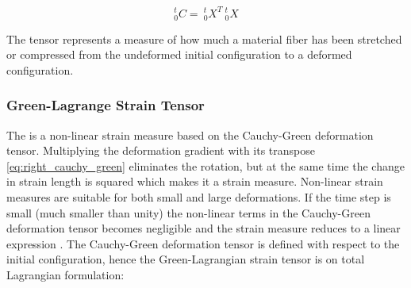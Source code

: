 \begin{equation}
\label{eq:right_cauchy_green}
^t_0C = \ ^t_0X^T \ ^t_0X
\end{equation}

The tensor represents a measure of how much a material fiber has been
stretched or compressed from the undeformed initial configuration to
a deformed configuration. 


\subsubsection*{Green-Lagrange Strain Tensor}
\label{sec:green_lagrange_strain_tensor}

The  is a non-linear strain
measure based on the Cauchy-Green deformation tensor.
Multiplying the deformation gradient with its transpose
\eqref{eq:right_cauchy_green} eliminates the rotation, but at the 
same time the change in strain length is squared which makes it a
 strain measure. Non-linear strain measures are suitable
for both small and large deformations. If the time step is small (much
smaller than unity) the non-linear terms in the Cauchy-Green
deformation tensor becomes negligible and the strain measure reduces
to a linear expression .
The Cauchy-Green deformation tensor is defined with respect to the
initial configuration, hence the Green-Lagrangian strain tensor is on
total Lagrangian formulation:   

